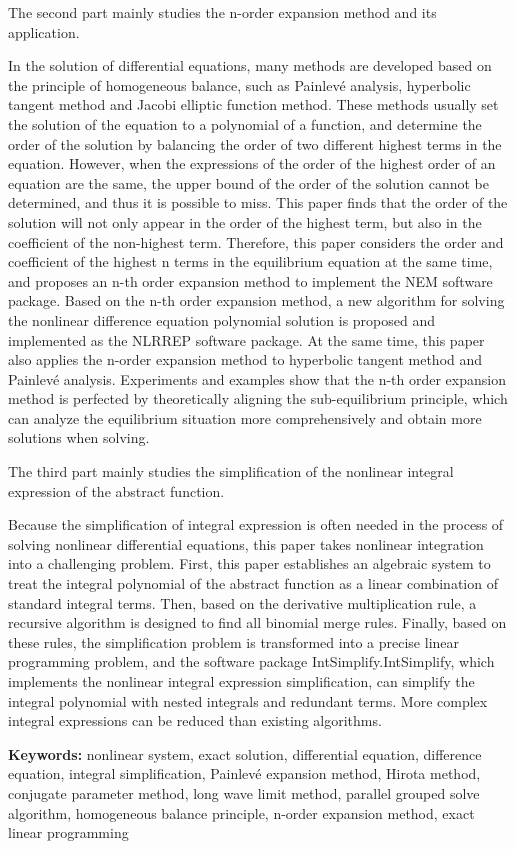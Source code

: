 The second part mainly studies the n-order expansion method and its application.

In the solution of differential equations, many methods are developed based on the principle of homogeneous balance, such as Painlevé analysis, hyperbolic tangent method and Jacobi elliptic function method. These methods usually set the solution of the equation to a polynomial of a function, and determine the order of the solution by balancing the order of two different highest terms in the equation. However, when the expressions of the order of the highest order of an equation are the same, the upper bound of the order of the solution cannot be determined, and thus it is possible to miss. This paper finds that the order of the solution will not only appear in the order of the highest term, but also in the coefficient of the non-highest term. Therefore, this paper considers the order and coefficient of the highest n terms in the equilibrium equation at the same time, and proposes an n-th order expansion method to implement the NEM software package. Based on the n-th order expansion method, a new algorithm for solving the nonlinear difference equation polynomial solution is proposed and implemented as the NLRREP software package. At the same time, this paper also applies the n-order expansion method to hyperbolic tangent method and Painlevé analysis. Experiments and examples show that the n-th order expansion method is perfected by theoretically aligning the sub-equilibrium principle, which can analyze the equilibrium situation more comprehensively and obtain more solutions when solving.

The third part mainly studies the simplification of the nonlinear integral expression of the abstract function.

Because the simplification of integral expression is often needed in the process of solving nonlinear differential equations, this paper takes nonlinear integration into a challenging problem. First, this paper establishes an algebraic system to treat the integral polynomial of the abstract function as a linear combination of standard integral terms. Then, based on the derivative multiplication rule, a recursive algorithm is designed to find all binomial merge rules. Finally, based on these rules, the simplification problem is transformed into a precise linear programming problem, and the software package IntSimplify.IntSimplify, which implements the nonlinear integral expression simplification, can simplify the integral polynomial with nested integrals and redundant terms. More complex integral expressions can be reduced than existing algorithms.

\bigskip
\noindent\textbf{ Keywords:}
nonlinear system, exact solution, differential equation, difference equation, integral simplification, Painlevé expansion method, Hirota method, conjugate parameter method, long wave limit method, parallel grouped solve algorithm, homogeneous balance principle, n-order expansion method, exact linear programming
